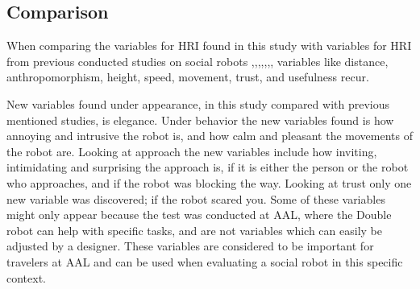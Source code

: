 \subsection{Comparison}
When comparing the variables for HRI found in this study with variables for HRI from previous conducted studies on social robots \cite{PDF:ExploringInfluencingVariable},\cite{PDF:SharingALifeHarvey},\cite{PDF:HowMayIServeYou},\cite{PDF:CloseButNotStuck},\cite{PDF:TheImpactOfTraveler},\cite{PDF:HumanRobotEmodiedInteraction},\cite{PDF:RecommendationEffects}, variables like distance, anthropomorphism, height, speed, movement, trust, and usefulness recur. 

New variables found under appearance, in this study compared with previous mentioned studies, is elegance. Under behavior the new variables found is how annoying and intrusive the robot is, and how calm and pleasant the movements of the robot are. Looking at approach the new variables include how inviting, intimidating and surprising the approach is, if it is either the person or the robot who approaches, and if the robot was blocking the way. Looking at trust only one new variable was discovered; if the robot scared you. Some of these variables might only appear because the test was conducted at AAL, where the Double robot can help with specific tasks, and are not variables which can easily be adjusted by a designer. These variables are considered to be important for travelers at AAL and can be used when evaluating a social robot in this specific context. 